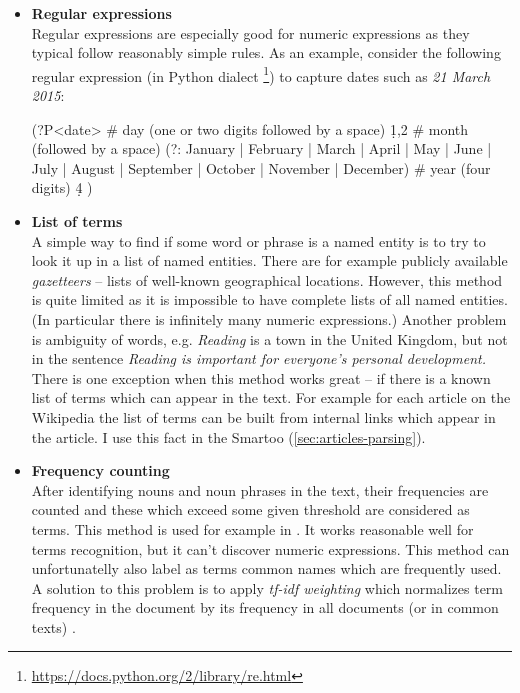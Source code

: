 \documentclass[12pt, twoside]{fithesis2}		%
\renewcommand{\_}{\leavevmode \kern0.07em\vbox{\hrule width0.4em}}
\newcommand{\squarebullet}{\textcolor{black}{\raisebox{0.15em}{\rule{4pt}{4pt}}}}
\newcommand{\emptysquarebullet}{\textcolor{black}{\raisebox{0.10em}{\tiny$\square$}}}
\newenvironment{myItemize}{
  \begin{itemize}[leftmargin=2em,rightmargin=1em,itemsep=\parskip ,parsep=0em,topsep=0em,partopsep=0em]
  \renewcommand{\labelitemi}{\squarebullet}
  \renewcommand{\labelitemii}{\textbullet}
}{
  \end{itemize}
}
\begin{document}
\begin{myItemize}
\item \textbf{Regular expressions}\\
  Regular expressions are especially good for numeric expressions as they typical follow reasonably simple rules.
  As an example, consider the following regular expression (in Python dialect%
  \footnote{\url{https://docs.python.org/2/library/re.html}})
  to capture dates such as \emph{21 March 2015}:
\begin{code}
(?P<date>
    # day (one or two digits followed by a space)
    \d{1,2} \s
    # month (followed by a space)
    (?: January | February | March | April | May | June | July |
         August | September | October | November | December) \s
    # year (four digits)
    \d{4}
)
\end{code}


\item \textbf{List of terms}\\
  A simple way to find if some word or phrase is a named entity is to try to look it up in a list of named entities. There are for example publicly available \textit{gazetteers} -- lists of well-known geographical locations. However, this method is quite limited as it is impossible to have complete lists of all named entities.
(In particular there is infinitely many numeric expressions.)
Another problem is ambiguity of words, e.g. \textit{Reading} is a town in the United Kingdom, but not in the sentence \textit{Reading is important for everyone's personal development.}
  There is one exception when this method works great -- if there is a known list of terms which can appear in the text. For example for each article on the Wikipedia the list of terms can be built from internal links which appear in the article. I use this fact in the Smartoo (\autoref{sec:articles-parsing}).

\item \textbf{Frequency counting}\\
  After identifying nouns and noun phrases in the text, their frequencies are counted and these which exceed some given threshold are considered as terms.
  This method is used for example in \cite{question-gen-mitkov}. It works reasonable well for terms recognition, but it can't discover numeric expressions.
This method can unfortunatelly also label as terms common names which are frequently used.
A solution to this problem is to apply \textit{tf-idf weighting} which normalizes term frequency in the document by its frequency in all documents (or in common texts) \cite[][118]{information-retrieval}.


\end{myItemize}
\end{document}
